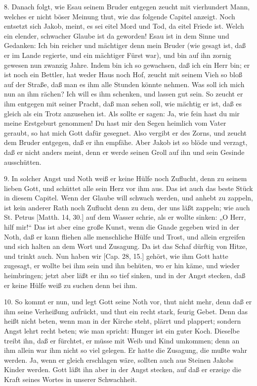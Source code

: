 8. Danach folgt, wie Esau seinem Bruder entgegen zeucht mit vierhundert Mann, welches er nicht böser Meinung thut, wie das folgende Capitel anzeigt. Noch entsetzt sich Jakob, meint, es sei eitel Mord und Tod, da eitel Friede ist. Welch ein elender, schwacher Glaube ist da geworden! Esau ist in dem Sinne und Gedanken: Ich bin reicher und mächtiger denn mein Bruder (wie gesagt ist, daß er im Lande regierte, und ein mächtiger Fürst war), und bin auf ihn zornig gewesen nun zwanzig Jahre. Indem bin ich so gewachsen, daß ich ein Herr bin; er ist noch ein Bettler, hat weder Haus noch Hof, zeucht mit seinem Vieh so bloß auf der Straße, daß man es ihm alle Stunden könnte nehmen. Was soll ich mich nun an ihm rächen? Ich will es ihm schenken, und lassen gut sein. So zeucht er ihm entgegen mit seiner Pracht, daß man sehen soll, wie mächtig er ist, daß es gleich als ein Trotz anzusehen ist. Als sollte er sagen: Ja, wie fein hast du mir meine Erstgeburt genommen! Du hast mir den Segen heimlich vom Vater geraubt, so hat mich Gott dafür gesegnet. Also vergibt er des Zorns, und zeucht dem Bruder entgegen, daß er ihn empfähe. Aber Jakob ist so blöde und verzagt, daß er nicht anders meint, denn er werde seinen Groll auf ihn und sein Gesinde ausschütten.

9. In solcher Angst und Noth weiß er keine Hülfe noch Zuflucht, denn zu seinem lieben Gott, und schüttet alle sein Herz vor ihm aus. Das ist auch das beste Stück in diesem Capitel. Wenn der Glaube will schwach werden, und anhebt zu zappeln, ist kein anderer Rath noch Zuflucht denn zu dem, der uns läßt zappeln; wie auch St. Petrus [Matth. 14, 30.] auf dem Wasser schrie, als er wollte sinken: „O Herr, hilf mir!“ Das ist aber eine große Kunst, wenn die Gnade gegeben wird in der Noth, daß er kann fliehen alle menschliche Hülfe und Trost, und allein ergreifen und sich halten an dem Wort und Zusagung. Da ist das Schaf dürftig von Hitze, und trinkt auch. Nun haben wir [Cap. 28, 15.] gehört, wie ihm Gott hatte zugesagt, er wollte bei ihm sein und ihn behüten, wo er hin käme, und wieder heimbringen; jetzt aber läßt er ihn so tief sinken, und in der Angst stecken, daß er keine Hülfe weiß zu suchen denn bei ihm.

10. So kommt er nun, und legt Gott seine Noth vor, thut nicht mehr, denn daß er ihm seine Verheißung aufrückt, und thut ein recht stark, feurig Gebet. Denn das heißt nicht beten, wenn man in der Kirche steht, plärrt und plappert; sondern Angst lehrt recht beten; wie man spricht: Hunger ist ein guter Koch. Dieselbe treibt ihn, daß er fürchtet, er müsse mit Weib und Kind umkommen; denn an ihm allein war ihm nicht so viel gelegen. Er hatte die Zusagung, die mußte wahr werden. Ja, wenn er gleich erschlagen wäre, sollten auch aus Steinen Jakobs Kinder werden. Gott läßt ihn aber in der Angst stecken, auf daß er erzeige die Kraft seines Wortes in unserer Schwachheit.

